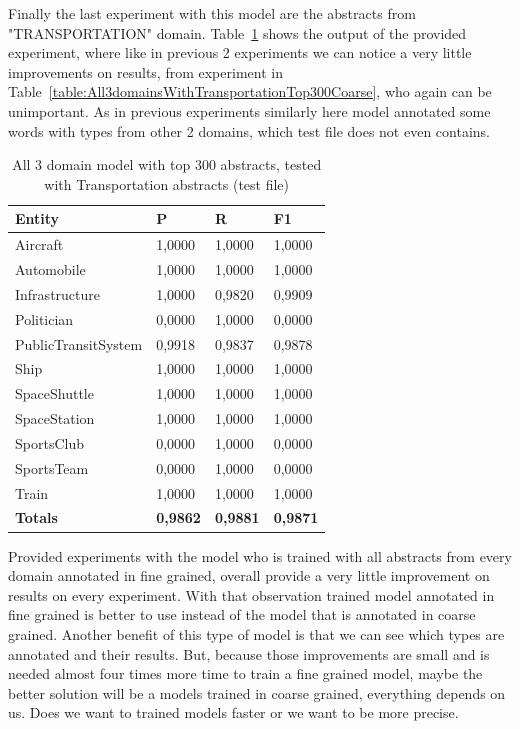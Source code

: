 \documentclass[thesis=M,english]{FITthesis}[2018/05/30]
\begin{document}
    Finally the last experiment with this model are the abstracts from "TRANSPORTATION" domain. Table~\ref{table:All3domainsWithTransportationTop300Fine} shows the output of the provided experiment, where like in previous 2 experiments we can notice a very little improvements on results, from experiment in Table~\ref{table:All3domainsWithTransportationTop300Coarse}, who again can be unimportant. As in previous experiments similarly here model annotated some words with types from other 2 domains, which test file does not even contains.

	\begin{table}[H]\centering
		\begin{tabular}{|l|l|l|l|}
			\hline {\textbf{Entity}} & {\textbf{P}} & {\textbf{R}} & {\textbf{F1}}\\\hline
				Aircraft & 1,0000 & 1,0000 & 1,0000\\
				Automobile & 1,0000 & 1,0000 & 1,0000\\				
				Infrastructure & 1,0000 & 0,9820 & 0,9909\\
				Politician & 0,0000 & 1,0000 & 0,0000\\				
				PublicTransitSystem & 0,9918 & 0,9837 & 0,9878\\
				Ship & 1,0000 & 1,0000 & 1,0000\\				
				SpaceShuttle & 1,0000 & 1,0000 & 1,0000\\
				SpaceStation & 1,0000 & 1,0000 & 1,0000\\
				SportsClub & 0,0000 & 1,0000 & 0,0000\\
				SportsTeam & 0,0000 & 1,0000 & 0,0000\\
				Train & 1,0000 & 1,0000 & 1,0000\\\hline
				\textbf{Totals} & \textbf{0,9862} & \textbf{0,9881} & \textbf{0,9871}\\\hline
		\end{tabular}
		\caption{All 3 domain model with top 300 abstracts, tested with Transportation abstracts (test file) \label{table:All3domainsWithTransportationTop300Fine}}
	\end{table}	
	
	Provided experiments with the model who is trained with all abstracts from every domain annotated in fine grained, overall provide a very little improvement on results on every experiment. With that observation trained model annotated in fine grained is better to use instead of the model that is annotated in coarse grained. Another benefit of this type of model is that we can see which types are annotated and their results. But, because those improvements are small and is needed almost four times more time to train a fine grained model, maybe the better solution will be a models trained in coarse grained, everything depends on us. Does we want to trained models faster or we want to be more precise. 
\end{document}
